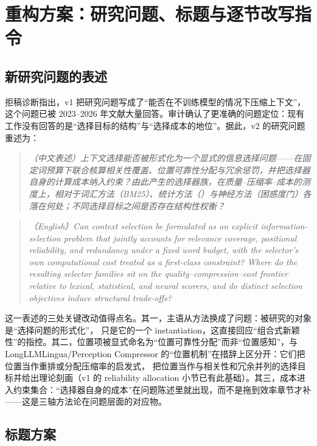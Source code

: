 \section{重构方案：研究问题、标题与逐节改写指令}
\label{sec:rewrite}

\subsection{新研究问题的表述}
\label{sec:req}

拒稿诊断指出，v1 把研究问题写成了``能否在不训练模型的情况下压缩上下文''，这个问题已被 2023--2026 年文献大量回答。审计确认了更准确的问题定位：现有工作没有回答的是``选择目标的结构''与``选择成本的地位''。据此，v2 的研究问题重述为：

\begin{quote}\itshape
（中文表述）上下文选择能否被形式化为一个显式的信息选择问题——在固定词预算下联合核算相关性覆盖、位置可靠性分配与冗余惩罚，并把选择器自身的计算成本纳入约束？由此产生的选择器族，在质量--压缩率--成本的测度上，相对于词汇方法（BM25）、统计方法（\sieve{}）与神经方法（困惑度门）各落在何处；不同选择目标之间是否存在结构性权衡？
\end{quote}

\begin{quote}\itshape
（English）Can context selection be formulated as an explicit information-selection problem that jointly accounts for relevance coverage, positional reliability, and redundancy under a fixed word budget, with the selector's own computational cost treated as a first-class constraint? Where do the resulting selector families sit on the quality--compression--cost frontier relative to lexical, statistical, and neural scorers, and do distinct selection objectives induce structural trade-offs?
\end{quote}

这一表述的三处关键改动值得点名。其一，主语从方法换成了问题：被研究的对象是``选择问题的形式化''，\sieve{} 只是它的一个 instantiation，这直接回应``组合式新颖性''的指控。其二，位置项被显式命名为``位置可靠性分配''而非``位置感知''，与 LongLLMLingua/Perception Compressor 的``位置机制''在措辞上区分开：它们把位置当作重排或分配压缩率的启发式，\sieve{} 把位置当作与相关性和冗余并列的选择目标并给出理论刻画（v1 的 reliability allocation 小节已有此基础）。其三，成本进入约束集合：``选择器自身的成本''在问题陈述里就出现，而不是拖到效率章节才补——这是三轴方法论在问题层面的对应物。

\subsection{标题方案}
\label{sec:retitle}

